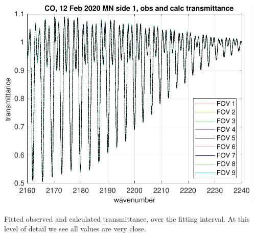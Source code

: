 \documentclass[9pt]{beamer}
\begin{document}
\begin{frame}
\begin{columns}[t]
\begin{column}{0.5\textwidth}
\end{column}
\begin{column}{0.5\textwidth}  
  \begin{centering}
  \includegraphics[width=\textwidth]{02-12_mn_s1_CO/CO_obs_and_calc.pdf}
  \end{centering}\vspace{3mm}

Fitted observed and calculated transmittance, over the fitting
interval.  At this level of detail we see all values are very close.

\end{column}
\end{columns}
\end{frame}
\end{document}
